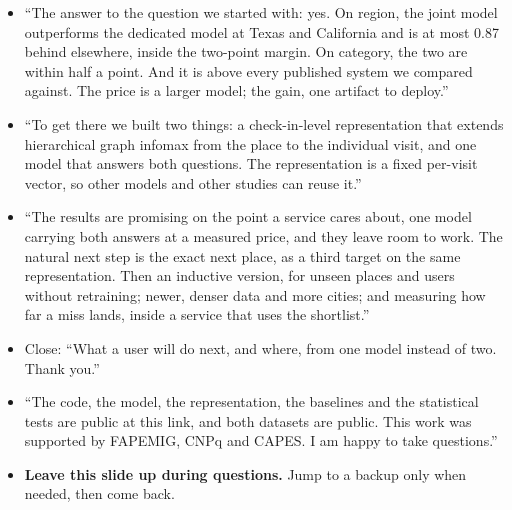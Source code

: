 \say
\begin{itemize}
  \item ``The answer to the question we started with: yes. On region, the joint model outperforms
        the dedicated model at Texas and California and is at most 0.87 behind elsewhere, inside the
        two-point margin. On category, the two are within half a point. And it is above every published
        system we compared against. The price is a larger model; the gain, one artifact to deploy.''
  \item ``To get there we built two things: a check-in-level representation that extends hierarchical
        graph infomax from the place to the individual visit, and one model that answers both
        questions. The representation is a fixed per-visit vector, so other models and other studies can
        reuse it.''
  \item ``The results are promising on the point a service cares about, one model carrying both
        answers at a measured price, and they leave room to work. The natural next step is the exact
        next place, as a third target on the same representation. Then an inductive version, for unseen
        places and users without retraining; newer, denser data and more cities; and measuring how far a
        miss lands, inside a service that uses the shortlist.''
  \item Close: ``What a user will do next, and where, from one model instead of two. Thank you.''
\end{itemize}

\say
\begin{itemize}
  \item ``The code, the model, the representation, the baselines and the statistical tests are public
        at this link, and both datasets are public. This work was supported by FAPEMIG, CNPq and CAPES.
        I am happy to take questions.''
  \item \textbf{Leave this slide up during questions.} Jump to a backup only when needed, then come back.
\end{itemize}

